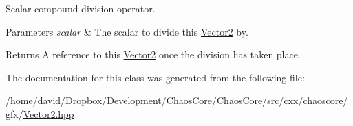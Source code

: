 Scalar compound division operator. 


\begin{DoxyParams}{Parameters}
{\em scalar} & The scalar to divide this \hyperlink{classchaos_1_1gfx_1_1_vector2}{Vector2} by. \\
\hline
\end{DoxyParams}
\begin{DoxyReturn}{Returns}
A reference to this \hyperlink{classchaos_1_1gfx_1_1_vector2}{Vector2} once the division has taken place. 
\end{DoxyReturn}


The documentation for this class was generated from the following file\-:\begin{DoxyCompactItemize}
\item 
/home/david/\-Dropbox/\-Development/\-Chaos\-Core/\-Chaos\-Core/src/cxx/chaoscore/gfx/\hyperlink{_vector2_8hpp}{Vector2.\-hpp}\end{DoxyCompactItemize}
